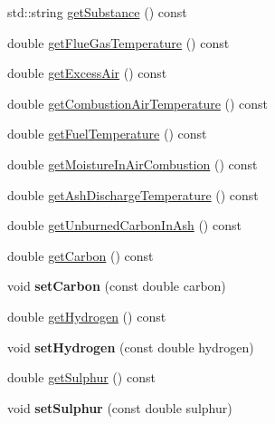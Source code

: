 \begin{DoxyCompactItemize}
std\+::string \hyperlink{class_solid_liquid_flue_gas_material_a6e07a23fb05c15c7e5dba39334988de8}{get\+Substance} () const
\item 
double \hyperlink{class_solid_liquid_flue_gas_material_aba4604158b3c624496d7de4b5fb511e2}{get\+Flue\+Gas\+Temperature} () const
\item 
double \hyperlink{class_solid_liquid_flue_gas_material_a49e7bb4ebc45897c81b6f38610ceaf02}{get\+Excess\+Air} () const
\item 
double \hyperlink{class_solid_liquid_flue_gas_material_a8757b831e5a2ef26dbb0cf271c0e8207}{get\+Combustion\+Air\+Temperature} () const
\item 
double \hyperlink{class_solid_liquid_flue_gas_material_a629ecc7104b6bfbb696d9478c4b48e7a}{get\+Fuel\+Temperature} () const
\item 
double \hyperlink{class_solid_liquid_flue_gas_material_ae3d9780851b8217ed2885753f11ec18b}{get\+Moisture\+In\+Air\+Combustion} () const
\item 
double \hyperlink{class_solid_liquid_flue_gas_material_ab233d4e27397cc74fbe2d3084e4e6f7c}{get\+Ash\+Discharge\+Temperature} () const
\item 
double \hyperlink{class_solid_liquid_flue_gas_material_a53ac34a949168a35297ab3afb9eb2c7b}{get\+Unburned\+Carbon\+In\+Ash} () const
\item 
double \hyperlink{class_solid_liquid_flue_gas_material_a7b8a98111943d30094e2d6950f7f2ec1}{get\+Carbon} () const
\item 
\mbox{\label{class_solid_liquid_flue_gas_material_ab89eddf949fefcc1ade049233c2dc12b}} 
void {\bfseries set\+Carbon} (const double carbon)
\item 
double \hyperlink{class_solid_liquid_flue_gas_material_a26af2edd53c50b071648d03bc6442fb6}{get\+Hydrogen} () const
\item 
\mbox{\label{class_solid_liquid_flue_gas_material_a44788e445519bb719a8ff9ca04702e21}} 
void {\bfseries set\+Hydrogen} (const double hydrogen)
\item 
double \hyperlink{class_solid_liquid_flue_gas_material_abe35d8ff283bfa5aadcf00f9906025ae}{get\+Sulphur} () const
\item 
\mbox{\label{class_solid_liquid_flue_gas_material_a34e4eaeb424bcf02dc29a5ab98172ef5}} 
void {\bfseries set\+Sulphur} (const double sulphur)

\end{DoxyCompactItemize}
